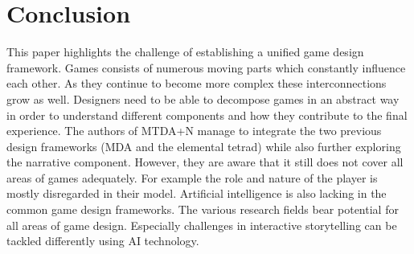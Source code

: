 \section{Conclusion}
This paper highlights the challenge of establishing a unified game design framework.
Games consists of numerous moving parts which constantly influence each other.
As they continue to become more complex these interconnections grow as well.
Designers need to be able to decompose games in an abstract way in order to understand different components and how they contribute to the final experience.
The authors of MTDA+N manage to integrate the two previous design frameworks (MDA and the elemental tetrad) while also further exploring the narrative component.
However, they are aware that it still does not cover all areas of games adequately.
For example the role and nature of the player is mostly disregarded in their model.
Artificial intelligence is also lacking in the common game design frameworks.
The various research fields bear potential for all areas of game design.
Especially challenges in interactive storytelling can be tackled differently using AI technology.